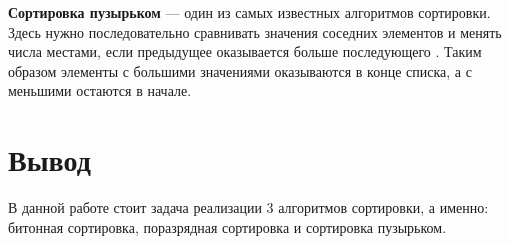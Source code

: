 \textbf{Сортировка пузырьком} — один из самых известных алгоритмов сортировки.
Здесь нужно последовательно сравнивать значения соседних элементов и менять числа местами, если предыдущее оказывается больше последующего \cite{sort3}.
Таким образом элементы с большими значениями оказываются в конце списка, а с меньшими остаются в начале.

\section{Вывод}
В данной работе стоит задача реализации 3 алгоритмов сортировки, а именно: битонная сортировка, поразрядная сортировка и сортировка пузырьком. 